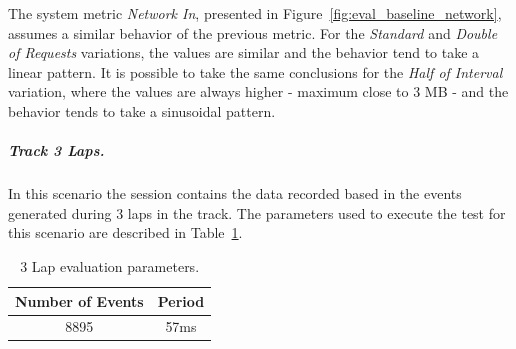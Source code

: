The system metric \textit{Network In}, presented in Figure~\ref{fig:eval_baseline_network}, assumes a
similar behavior of the previous metric. For the \textit{Standard} and \textit{Double of Requests} variations,
the values are similar and the behavior tend to take a linear pattern. It is possible to take the same
conclusions for the \textit{Half of Interval} variation, where the values are always higher - maximum
close to 3 \gls{MB} - and the behavior tends to take a sinusoidal pattern.

\subparagraph{Track 3 Laps.}
\label{subp:eval_exp_data_3laps}
In this scenario the session contains the data recorded based in the events generated during 3 laps
in the track. The parameters used to execute the test for this scenario are described in
Table~\ref{tab:3laps_parameters}.\\

\begin{table}[ht!]
  \begin{tabular}{|c|c|}
    \hline
    Number of Events & Period \\ \hline
    8895             & 57ms   \\ \hline
  \end{tabular}
  \caption{3 Lap evaluation parameters.}
  \label{tab:3laps_parameters}
\end{table}


